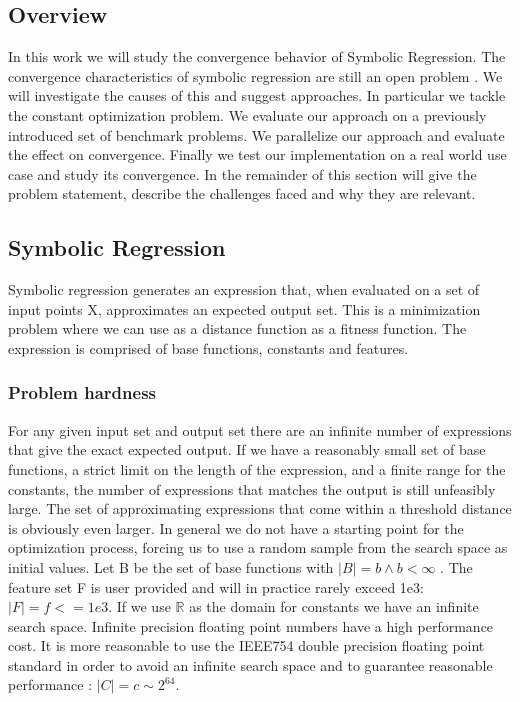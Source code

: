 \subsection{Overview}
In this work we will study the convergence behavior of Symbolic Regression. The convergence characteristics of symbolic regression are still an open problem \cite{SRBaseline, SRAccur, SRAccuracy, FFX}. We will investigate the causes of this and suggest approaches. In particular we tackle the constant optimization problem. We evaluate our approach on a previously introduced \cite{SRBaseline} set of benchmark problems. We parallelize our approach and evaluate the effect on convergence. Finally we test our implementation on a real world use case and study its convergence.
In the remainder of this section will give the problem statement, describe the challenges faced and why they are relevant.


\subsection{Symbolic Regression}
Symbolic regression generates an expression that, when evaluated on a set of input points X, approximates an expected output set. This is a minimization problem where we can use as a distance function as a fitness function. The expression is comprised of base functions, constants and features. 

\subsubsection{Problem hardness}
For any given input set and output set there are an infinite number of expressions that give the exact expected output. If we have a reasonably small set of base functions, a strict limit on the length of the expression, and a finite range for the constants, the number of expressions that matches the output is still unfeasibly large. The set of approximating expressions that come within a threshold distance is obviously even larger. In general we do not have a starting point for the optimization process, forcing us to use a random sample from the search space as initial values.
Let B be the set of base functions with $\vert B \vert = b \land b < \infty$ . The feature set F is user provided and will in practice rarely exceed 1e3: $\vert F \vert = f <= 1e3$. 
If we use $\mathbb{R}$ as the domain for constants we have an infinite search space. Infinite precision floating point numbers have a high performance cost. It is more reasonable to use the IEEE754  double precision floating point standard in order to avoid an infinite search space and to guarantee reasonable performance :  $\vert C \vert = c \sim 2^{64}$.

